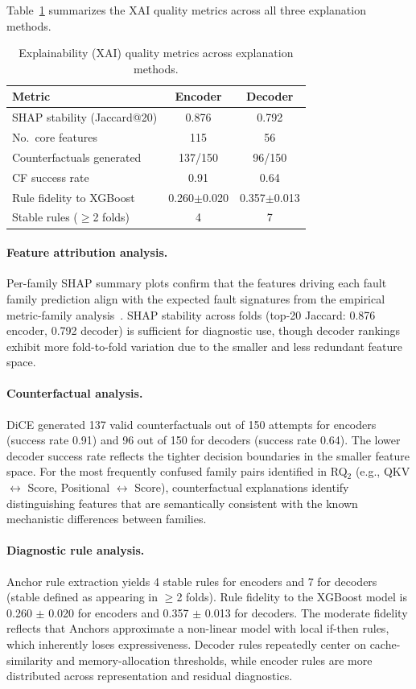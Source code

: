 Table~\ref{tab:xai} summarizes the XAI quality metrics across all three explanation methods.

\begin{table}[!ht]
\centering
\caption{Explainability (XAI) quality metrics across explanation methods.}
\label{tab:xai}
\small
\begin{tabular}{l cc}
\toprule
Metric & Encoder & Decoder \\
\midrule
SHAP stability (Jaccard@20) & 0.876 & 0.792 \\
No.\ core features & 115 & 56 \\
\midrule
Counterfactuals generated & 137/150 & 96/150 \\
CF success rate & 0.91 & 0.64 \\
\midrule
Rule fidelity to XGBoost & 0.260$\pm$0.020 & 0.357$\pm$0.013 \\
Stable rules ($\geq$2 folds) & 4 & 7 \\
\bottomrule
\end{tabular}
\end{table}

\paragraph{Feature attribution analysis.}
Per-family SHAP summary plots confirm that the features driving each fault family prediction align with the expected fault signatures from the empirical metric-family analysis~\cite{frankenformer}. SHAP stability across folds (top-20 Jaccard: 0.876 encoder, 0.792 decoder) is sufficient for diagnostic use, though decoder rankings exhibit more fold-to-fold variation due to the smaller and less redundant feature space.

\paragraph{Counterfactual analysis.}
DiCE generated 137 valid counterfactuals out of 150 attempts for encoders (success rate 0.91) and 96 out of 150 for decoders (success rate 0.64). The lower decoder success rate reflects the tighter decision boundaries in the smaller feature space. For the most frequently confused family pairs identified in RQ$_2$ (e.g., QKV $\leftrightarrow$ Score, Positional $\leftrightarrow$ Score), counterfactual explanations identify distinguishing features that are semantically consistent with the known mechanistic differences between families.

\paragraph{Diagnostic rule analysis.}
Anchor rule extraction yields 4 stable rules for encoders and 7 for decoders (stable defined as appearing in $\geq$2 folds). Rule fidelity to the XGBoost model is 0.260 $\pm$ 0.020 for encoders and 0.357 $\pm$ 0.013 for decoders. The moderate fidelity reflects that Anchors approximate a non-linear model with local if-then rules, which inherently loses expressiveness. Decoder rules repeatedly center on cache-similarity and memory-allocation thresholds, while encoder rules are more distributed across representation and residual diagnostics.


